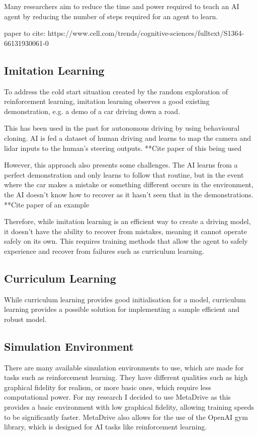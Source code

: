 Many researchers aim to reduce the time and power required to teach an AI agent by reducing the number of steps required for an agent to learn.

paper to cite: https://www.cell.com/trends/cognitive-sciences/fulltext/S1364-66131930061-0

\subsection{Imitation Learning}
To address the cold start situation created by the random exploration of reinforcement learning, imitation learning observes a good existing demonstration, e.g. a demo of a car driving down a road. 

This has been used in the past for autonomous driving by using behavioural cloning. AI is fed a dataset of human driving and learns to map the camera and lidar inputs to the human's steering outputs.
**Cite paper of this being used

However, this approach also presents some challenges. The AI learns from a perfect demonstration and only learns to follow that routine, but in the event where the car makes a mistake or something different occurs in the environment, the AI doesn't know how to recover as it hasn't seen that in the demonstrations.
**Cite paper of an example

Therefore, while imitation learning is an efficient way to create a driving model, it doesn't have the ability to recover from mistakes, meaning it cannot operate safely on its own. This requires training methods that allow the agent to safely experience and recover from failures such as curriculum learning.

\subsection{Curriculum Learning}
While curriculum learning provides good initialisation for a model, curriculum learning provides a possible solution for implementing a sample efficient and robust model.




\subsection{Simulation Environment}

There are many available simulation environments to use, which are made for tasks such as reinforcement learning. They have different qualities such as high graphical fidelity for realism, or more basic ones, which require less computational power. For my research I decided to use MetaDrive as this provides a basic environment with low graphical fidelity, allowing training speeds to be significantly faster. MetaDrive also allows for the use of the OpenAI gym library, which is designed for AI tasks like reinforcement learning.

